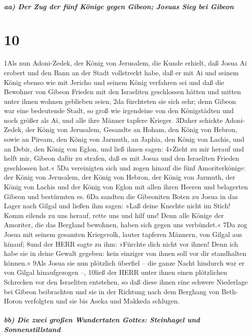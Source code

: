 \hypertarget{aa-der-zug-der-fuxfcnf-kuxf6nige-gegen-gibeon-josuas-sieg-bei-gibeon}{%
\subparagraph{aa) Der Zug der fünf Könige gegen Gibeon; Josuas Sieg bei
Gibeon}\label{aa-der-zug-der-fuxfcnf-kuxf6nige-gegen-gibeon-josuas-sieg-bei-gibeon}}

\hypertarget{section-9}{%
\section{10}\label{section-9}}

1Als nun Adoni-Zedek, der König von Jerusalem, die Kunde erhielt, daß
Josua Ai erobert und den Bann an der Stadt vollstreckt habe, daß er mit
Ai und seinem König ebenso wie mit Jericho und seinem König verfahren
sei und daß die Bewohner von Gibeon Frieden mit den Israeliten
geschlossen hätten und mitten unter ihnen wohnen geblieben seien, 2da
fürchteten sie sich sehr; denn Gibeon war eine bedeutende Stadt, so groß
wie irgendeine von den Königstädten und noch größer als Ai, und alle
ihre Männer tapfere Krieger. 3Daher schickte Adoni-Zedek, der König von
Jerusalem, Gesandte an Hoham, den König von Hebron, sowie an Piream, den
König von Jarmuth, an Japhia, den König von Lachis, und an Debir, den
König von Eglon, und ließ ihnen sagen: 4»Zieht zu mir herauf und helft
mir, Gibeon dafür zu strafen, daß es mit Josua und den Israeliten
Frieden geschlossen hat.« 5Da vereinigten sich und zogen hinauf die fünf
Amoriterkönige: der König von Jerusalem, der König von Hebron, der König
von Jarmuth, der König von Lachis und der König von Eglon mit allen
ihren Heeren und belagerten Gibeon und bestürmten es. 6Da sandten die
Gibeoniten Boten zu Josua in das Lager nach Gilgal und ließen ihm sagen:
»Laß deine Knechte nicht im Stich! Komm eilends zu uns herauf, rette uns
und hilf uns! Denn alle Könige der Amoriter, die das Bergland bewohnen,
haben sich gegen uns verbündet.« 7Da zog Josua mit seinem gesamten
Kriegsvolk, lauter tapferen Männern, von Gilgal aus hinauf; 8und der
HERR sagte zu ihm: »Fürchte dich nicht vor ihnen! Denn ich habe sie in
deine Gewalt gegeben: kein einziger von ihnen soll vor dir standhalten
können.« 9Als Josua sie nun plötzlich überfiel -- die ganze Nacht
hindurch war er von Gilgal hinaufgezogen --, 10ließ der HERR unter ihnen
einen plötzlichen Schrecken vor den Israeliten entstehen, so daß diese
ihnen eine schwere Niederlage bei Gibeon beibrachten und sie in der
Richtung nach dem Berghang von Beth-Horon verfolgten und sie bis Aseka
und Makkeda schlugen.

\hypertarget{bb-die-zwei-grouxdfen-wundertaten-gottes-steinhagel-und-sonnenstillstand}{%
\subparagraph{bb) Die zwei großen Wundertaten Gottes: Steinhagel und
Sonnenstillstand}\label{bb-die-zwei-grouxdfen-wundertaten-gottes-steinhagel-und-sonnenstillstand}}

